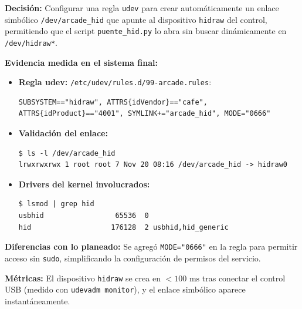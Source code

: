 \textbf{Decisión:} Configurar una regla \texttt{udev} para crear automáticamente un enlace simbólico \texttt{/dev/arcade\_hid} que apunte al dispositivo \texttt{hidraw} del control, permitiendo que el script \texttt{puente\_hid.py} lo abra sin buscar dinámicamente en \texttt{/dev/hidraw*}.

\textbf{Evidencia medida en el sistema final:}
\begin{itemize}
	\item \textbf{Regla udev:} \texttt{/etc/udev/rules.d/99-arcade.rules}:
	\begin{lstlisting}
SUBSYSTEM=="hidraw", ATTRS{idVendor}=="cafe", ATTRS{idProduct}=="4001", SYMLINK+="arcade_hid", MODE="0666"
	\end{lstlisting}
	\item \textbf{Validación del enlace:}
	\begin{lstlisting}
$ ls -l /dev/arcade_hid
lrwxrwxrwx 1 root root 7 Nov 20 08:16 /dev/arcade_hid -> hidraw0
	\end{lstlisting}
	\item \textbf{Drivers del kernel involucrados:}
	\begin{lstlisting}
$ lsmod | grep hid
usbhid                 65536  0
hid                   176128  2 usbhid,hid_generic
	\end{lstlisting}
\end{itemize}

\textbf{Diferencias con lo planeado:} Se agregó \texttt{MODE="0666"} en la regla para permitir acceso sin \texttt{sudo}, simplificando la configuración de permisos del servicio.

\textbf{Métricas:} El dispositivo \texttt{hidraw} se crea en $< 100\text{ ms}$ tras conectar el control USB (medido con \texttt{udevadm monitor}), y el enlace simbólico aparece instantáneamente.
